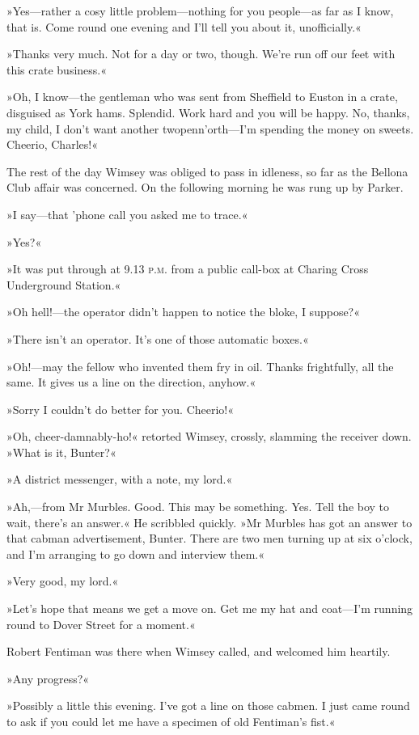 »Yes—rather a cosy little problem—nothing for you people—as far as I know, that is. Come round one evening and I'll tell you about it, unofficially.«

»Thanks very much. Not for a day or two, though. We're run off our feet with this crate business.«

»Oh, I know—the gentleman who was sent from Sheffield to Euston in a crate, disguised as York hams. Splendid. Work hard and you will be happy. No, thanks, my child, I don't want another twopenn'orth—I'm spending the money on sweets. Cheerio, Charles!«

The rest of the day Wimsey was obliged to pass in idleness, so far as the Bellona Club affair was concerned. On the following morning he was rung up by Parker.

»I say—that 'phone call you asked me to trace.«

»Yes?«

»It was put through at 9.13 \textsc{p.m.} from a public call-box at Charing Cross Underground Station.«

»Oh hell!—the operator didn't happen to notice the bloke, I suppose?«

»There isn't an operator. It's one of those automatic boxes.«

»Oh!—may the fellow who invented them fry in oil. Thanks frightfully, all the same. It gives us a line on the direction, anyhow.«

»Sorry I couldn't do better for you. Cheerio!«

»Oh, cheer-damnably-ho!« retorted Wimsey, crossly, slamming the receiver down. »What is it, Bunter?«

»A district messenger, with a note, my lord.«

»Ah,—from Mr Murbles. Good. This may be something. Yes. Tell the boy to wait, there's an answer.« He scribbled quickly. »Mr Murbles has got an answer to that cabman advertisement, Bunter. There are two men turning up at six o'clock, and I'm arranging to go down and interview them.«

»Very good, my lord.«

»Let's hope that means we get a move on. Get me my hat and coat—I'm running round to Dover Street for a moment.«

Robert Fentiman was there when Wimsey called, and welcomed him heartily.

»Any progress?«

»Possibly a little this evening. I've got a line on those cabmen. I just came round to ask if you could let me have a specimen of old Fentiman's fist.«

